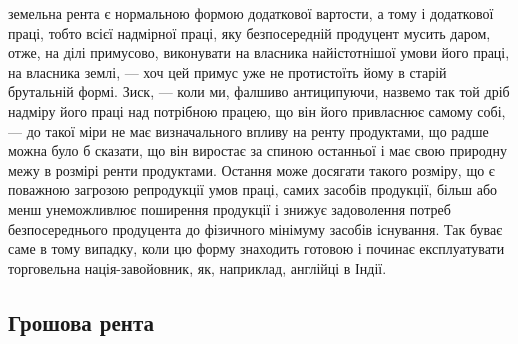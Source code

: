 \parcont{}  %
земельна рента є нормальною формою додаткової вартости, а тому і додаткової
праці, тобто всієї надмірної праці, яку безпосередній продуцент мусить даром,
отже, на ділі примусово, виконувати на власника найістотнішої умови його
праці, на власника землі, — хоч цей примус уже не протистоїть йому в старій
брутальній формі. Зиск, — коли ми, фалшиво антиципуючи, назвемо так той
дріб надміру його праці над потрібною працею, що він його привласнює самому
собі, — до такої міри не має визначального впливу на ренту продуктами, що
радше можна було б сказати, що він виростає за спиною останньої і має свою
природну межу в розмірі ренти продуктами. Остання може досягати такого
розміру, що є поважною загрозою репродукції умов праці, самих засобів продукції,
більш або менш унеможливлює поширення продукції і знижує задоволення
потреб безпосереднього продуцента до фізичного мінімуму засобів
існування. Так буває саме в тому випадку, коли цю форму знаходить готовою
і починає експлуатувати торговельна нація-завойовник, як, наприклад, англійці
в Індії.

\subsection{Грошова рента}

